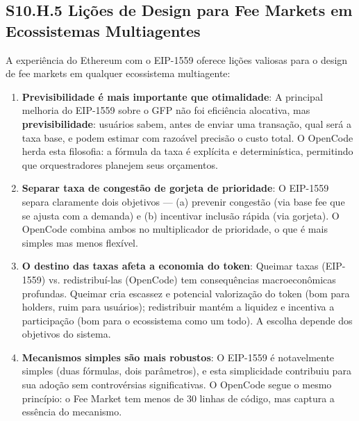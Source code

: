 \subsection*{S10.H.5 Lições de Design para Fee Markets em Ecossistemas Multiagentes}

A experiência do Ethereum com o EIP-1559 oferece lições valiosas para o design de fee markets em qualquer ecossistema multiagente:

\begin{enumerate}
    \item \textbf{Previsibilidade é mais importante que otimalidade}: A principal melhoria do EIP-1559 sobre o GFP não foi eficiência alocativa, mas \textbf{previsibilidade}: usuários sabem, antes de enviar uma transação, qual será a taxa base, e podem estimar com razoável precisão o custo total. O OpenCode herda esta filosofia: a fórmula da taxa é explícita e determinística, permitindo que orquestradores planejem seus orçamentos.
    
    \item \textbf{Separar taxa de congestão de gorjeta de prioridade}: O EIP-1559 separa claramente dois objetivos --- (a) prevenir congestão (via base fee que se ajusta com a demanda) e (b) incentivar inclusão rápida (via gorjeta). O OpenCode combina ambos no multiplicador de prioridade, o que é mais simples mas menos flexível.
    
    \item \textbf{O destino das taxas afeta a economia do token}: Queimar taxas (EIP-1559) vs. redistribuí-las (OpenCode) tem consequências macroeconômicas profundas. Queimar cria escassez e potencial valorização do token (bom para holders, ruim para usuários); redistribuir mantém a liquidez e incentiva a participação (bom para o ecossistema como um todo). A escolha depende dos objetivos do sistema.
    
    \item \textbf{Mecanismos simples são mais robustos}: O EIP-1559 é notavelmente simples (duas fórmulas, dois parâmetros), e esta simplicidade contribuiu para sua adoção sem controvérsias significativas. O OpenCode segue o mesmo princípio: o Fee Market tem menos de 30 linhas de código, mas captura a essência do mecanismo.
\end{enumerate}


